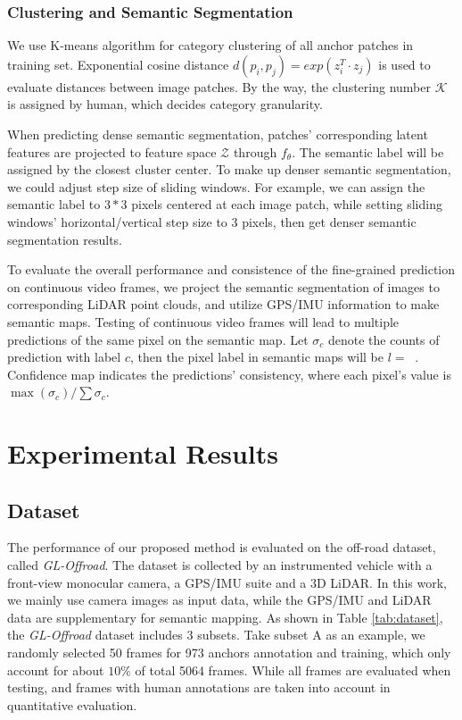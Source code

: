 \documentclass[letterpaper, 10 pt, conference]{ieeeconf}  %
\begin{document}
\subsubsection{Clustering and Semantic Segmentation} \label{3_CSS}

We use K-means algorithm for category clustering of all anchor patches in training set. Exponential cosine distance $d(p_i,p_j)=exp(z_i^T \cdot z_j)$ is used to evaluate distances between image patches. By the way, the clustering number $\mathcal{K}$ is assigned by human, which decides category granularity.

When predicting dense semantic segmentation, patches' corresponding latent features are projected to feature space $\mathcal{Z}$ through $f_\theta$. The semantic label will be assigned by the closest cluster center. To make up denser semantic segmentation, we could adjust step size of sliding windows. For example, we can assign the semantic label to $3*3$ pixels centered at each image patch, while setting sliding windows' horizontal/vertical step size to 3 pixels, then get denser semantic segmentation results.

To evaluate the overall performance and consistence of the fine-grained prediction on continuous video frames, we project the semantic segmentation of images to corresponding LiDAR point clouds, and utilize GPS/IMU information to make semantic maps. Testing of continuous video frames will lead to multiple predictions of the same pixel on the semantic map. Let $\sigma_c$ denote the counts of prediction with label $c$, then the pixel label in semantic maps will be $l=\mathop{\text{argmax}_{c} (\sigma_c)}$. Confidence map indicates the predictions' consistency, where each pixel's value is $\max(\sigma_c)/\sum{\sigma_c}$.

\section{Experimental Results}	\label{exp}
\subsection{Dataset}
The performance of our proposed method is evaluated on the off-road dataset, called \textit{GL-Offroad}. The dataset is collected by an instrumented vehicle with a front-view monocular camera, a GPS/IMU suite and a 3D LiDAR. In this work, we mainly use camera images as input data, while the GPS/IMU and LiDAR data are supplementary for semantic mapping.
As shown in Table \ref{tab:dataset}, the \textit{GL-Offroad} dataset includes 3 subsets. Take subset A as an example, we randomly selected 50 frames for 973 anchors annotation and training, which only account for about $10\%$ of total 5064 frames. While all frames are evaluated when testing, and frames with human annotations are taken into account in quantitative evaluation.
\end{document}
